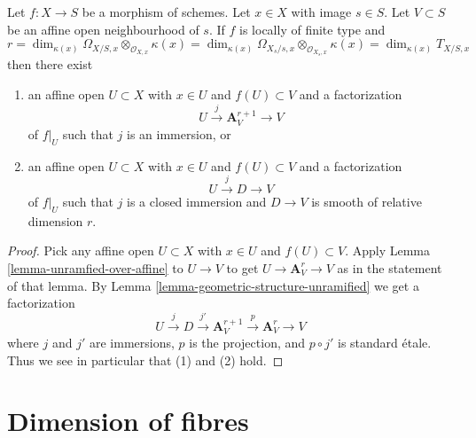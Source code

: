 \begin{lemma}
\label{lemma-immersion-into-affine}
Let $f : X \to S$ be a morphism of schemes.
Let $x \in X$ with image $s \in S$. Let $V \subset S$ be
an affine open neighbourhood of $s$. If $f$ is locally of
finite type and
$$
r =
\dim_{\kappa(x)} \Omega_{X/S, x} \otimes_{\mathcal{O}_{X, x}} \kappa(x) =
\dim_{\kappa(x)} \Omega_{X_s/s, x} \otimes_{\mathcal{O}_{X_s, x}} \kappa(x) =
\dim_{\kappa(x)} T_{X/S, x}
$$
then there exist
\begin{enumerate}
\item an affine open $U \subset X$ with $x \in U$ and $f(U) \subset V$ and a
factorization
$$
U \xrightarrow{j} \mathbf{A}^{r + 1}_V \to V
$$
of $f|_U$ such that $j$ is an immersion, or
\item an affine open $U \subset X$ with $x \in U$ and $f(U) \subset V$ and a
factorization
$$
U \xrightarrow{j} D \to V
$$
of $f|_U$ such that $j$ is a closed immersion and $D \to V$
is smooth of relative dimension $r$.
\end{enumerate}
\end{lemma}

\begin{proof}
Pick any affine open $U \subset X$ with $x \in U$ and $f(U) \subset V$.
Apply Lemma \ref{lemma-unramfied-over-affine} to $U \to V$ to
get $U \to \mathbf{A}^r_V \to V$ as in the statement of that lemma.
By Lemma \ref{lemma-geometric-structure-unramified}
we get a factorization
$$
U \xrightarrow{j} D \xrightarrow{j'} \mathbf{A}^{r + 1}_V
\xrightarrow{p} \mathbf{A}^r_V \to V
$$
where $j$ and $j'$ are immersions, $p$ is the projection, and
$p \circ j'$ is standard \'etale. Thus we see in particular that
(1) and (2) hold.
\end{proof}





\section{Dimension of fibres}
\label{section-dimension-fibres}

